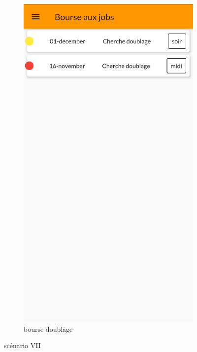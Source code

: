\begin{figure}[!h]
\begin{subfigure}{.3\textwidth}
                \includegraphics[width=0.9\linewidth]{screenshots/scenario_07/bourse_doublage.png}
                \caption{bourse doublage}
                \label{fig:bourse_doublage}
            \end{subfigure}
            \caption{scénario VII}
            \label{fig:scen07}
        \end{figure}

